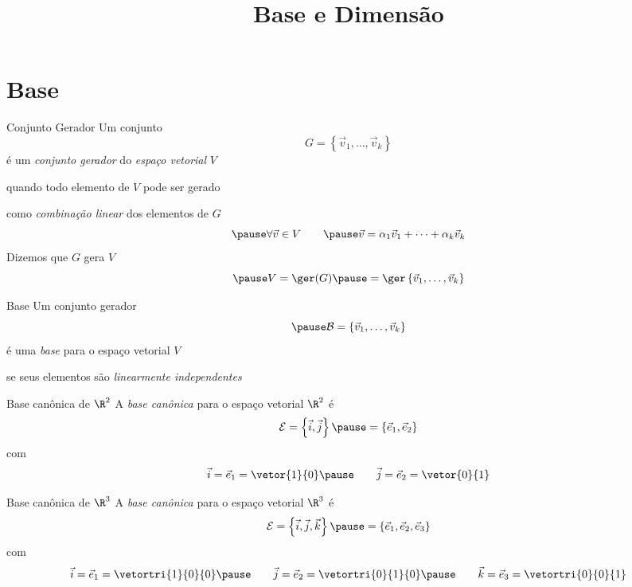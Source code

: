 \documentclass[fleqn,aspectratio=169,12pt]{beamer}
\title{Base e Dimensão}
\begin{document}
\addtitle

\section{Base}

\begin{frame}{Conjunto Gerador}
  Um conjunto
  \[
    G = \left\{ \vec{v}_{1}, \ldots, \vec{v}_{k} \right\}
  \]
  \pause
  é um \emph{conjunto gerador} do \emph{espaço vetorial} $V$

  \pause
  quando todo elemento de $V$ pode ser gerado

  \pause
  como \emph{combinação linear} dos elementos de $G$
  \[
    \pause
    \forall \vec{v}\in V
    \qquad
    \pause
    \vec{v} = \alpha_1\vec{v}_{1} + \cdots + \alpha_k\vec{v}_{k}
  \]
  \pause
  Dizemos que \(G\) gera \(V\)
  \[
    \pause
    V
    = \ger(G)
    \pause
    = \ger\left\{ \vec{v}_{1}, \ldots, \vec{v}_{k} \right\}
  \]
\end{frame}

\begin{frame}{Base}
  Um conjunto gerador
  \[
    \pause
    \mathcal{B} = \left\{ \vec{v}_{1}, \ldots, \vec{v}_{k} \right\}
  \]
  \pause
  é uma \emph{base} para o espaço vetorial $V$

  \pause
  se seus elementos são \emph{linearmente independentes}
\end{frame}

\begin{frame}[t]{Base canônica de $\R^2$}
  A \emph{base canônica} para o espaço vetorial \(\R^2\)
  \pause
  é
  \[
    \mathcal{E}
    = \left\{ \vec{i}, \vec{j} \right\}
    \pause
    = \left\{ \vec{e}_{1}, \vec{e}_{2} \right\}
  \]
  \pause
  com
  \[
    \vec{i} = \vec{e}_1 = \vetor{1}{0} \pause \qquad
    \vec{j} = \vec{e}_2 = \vetor{0}{1}
  \]
\end{frame}

\begin{frame}[t]{Base canônica de $\R^3$}
  A \emph{base canônica} para o espaço vetorial \(\R^3\)
  \pause
  é
  \[
    \mathcal{E}
    = \left\{ \vec{i}, \vec{j}, \vec{k} \right\}
    \pause
    = \left\{ \vec{e}_{1}, \vec{e}_{2}, \vec{e}_{3} \right\}
  \]
  \pause
  com
  \[
    \vec{i} = \vec{e}_1 = \vetortri{1}{0}{0} \pause \qquad
    \vec{j} = \vec{e}_2 = \vetortri{0}{1}{0} \pause \qquad
    \vec{k} = \vec{e}_3 = \vetortri{0}{0}{1}
  \]
\end{frame}
\end{document}
